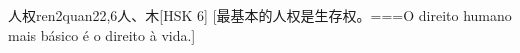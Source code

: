 \begin{EntryWithPhonetic}{人权}{ren2quan2}{2,6}{⼈、⽊}[HSK 6]
  [最基本的人权是生存权。===O direito humano mais básico é o direito à vida.]
\end{EntryWithPhonetic}
